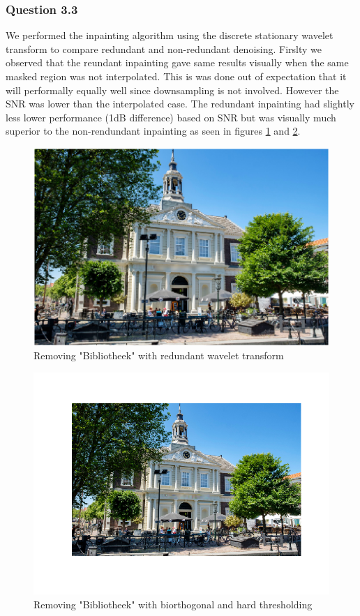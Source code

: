 \documentclass[a4paper]{article}
\begin{document}
\subsubsection{Question 3.3}
We performed the inpainting algorithm using the discrete stationary wavelet transform to compare redundant and non-redundant denoising. Firslty we observed that the reundant inpainting gave same results visually when the same masked region was not interpolated. This is was done out of expectation that it will performally equally well since downsampling is not involved. However the SNR was lower than the interpolated case. The redundant inpainting had slightly less lower performance (1dB difference) based on SNR but was visually much superior to the non-rendundant inpainting as seen in figures \ref{WorkingRed}
and \ref{NonRedundBib}.
\begin{figure}[H]
	\centering %
	\includegraphics[width=0.9\linewidth]{Images/Redundant_all_letters.png}
	\caption{Removing "Bibliotheek" with  redundant wavelet transform}
	\label{WorkingRed}
\end{figure}

\begin{figure}[H]
	\centering %
	\includegraphics[width=1.1\linewidth]{Images/non-RedundantAllLeters.png}
	\caption{Removing "Bibliotheek" with biorthogonal and hard thresholding}
	\label{NonRedundBib}
\end{figure}
\end{document}
